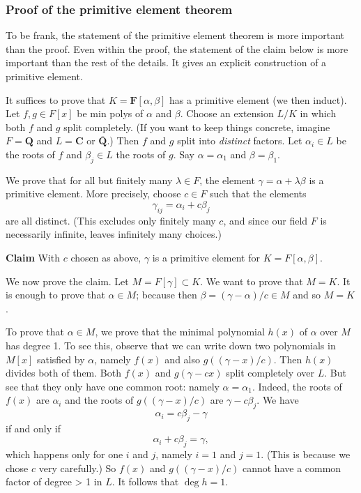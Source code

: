 \documentclass[11pt]{article}
\begin{document}
\subsubsection{Proof of the primitive element theorem}
\label{sec:orgcbde49d}

To be frank, the statement of the primitive element theorem is more important than the proof.
Even within the proof, the statement of the claim below is more important than the rest of the details.
It gives an explicit construction of a primitive element.

It suffices to prove that \(K = \mathbf{F}[\alpha, \beta]\) has a primitive element (we then induct).
Let \(f,g \in F[x]\) be min polys of \(\alpha\) and \(\beta\).
Choose an extension \(L / K\) in which both \(f\) and \(g\) split completely.
(If you want to keep things concrete, imagine \(F = \mathbf{Q}\) and \(L = \mathbf{C}\) or \(\overline{\mathbf{Q}}\).)
Then \(f\) and \(g\) split into \emph{distinct} factors.
Let \(\alpha_i \in L\) be the roots of \(f\) and \(\beta_j \in L\) the roots of \(g\).
Say \(\alpha = \alpha_1\) and \(\beta = \beta_1\).

We prove that for all but finitely many \(\lambda \in F\), the element \(\gamma = \alpha + \lambda \beta\) is a primitive element.
More precisely, choose \(c \in F\) such that the elements
\[ \gamma_{ij} = \alpha_i + c \beta_j\]
are all distinct.
(This excludes only  finitely many \(c\), and since our field \(F\) is necessarily infinite, leaves infinitely many choices.)

\textbf{\textbf{Claim}} With \(c\) chosen as above, \(\gamma\) is a primitive element for \(K = F[\alpha,\beta]\).

We now prove the claim.
Let \(M = F[\gamma] \subset K\).
We want to prove that \(M = K\).
It is enough to prove that \(\alpha \in M\); because then \(\beta = (\gamma - \alpha)/c \in M\) and so \(M = K\).

To prove that \(\alpha \in M\), we prove that the minimal polynomial \(h(x)\) of \(\alpha\) over \(M\) has degree 1.
To see this, observe that we can write down two polynomials in \(M[x]\) satisfied by \(\alpha\), namely \(f(x)\) and also \(g((\gamma - x)/c)\).
Then \(h(x)\) divides both of them.
Both \(f(x)\) and \(g(\gamma - cx)\) split completely over \(L\).
But see that they only have one common root: namely \(\alpha = \alpha_1\).
Indeed, the roots of \(f(x)\) are \(\alpha_i\) and the roots of \(g((\gamma - x)/c)\) are \(\gamma - c \beta_{j}\).
We have
\[ \alpha_i = c\beta_j - \gamma\]
if and only if
\[  \alpha_i + c\beta_j = \gamma,\]
which happens only for one \(i\) and \(j\), namely \(i = 1\) and \(j = 1\).
(This is because we chose \(c\) very carefully.)
So \(f(x)\) and \(g((\gamma - x)/c)\) cannot have a common factor of degree > 1 in \(L\).
It follows that \(\deg h = 1\).
\end{document}
